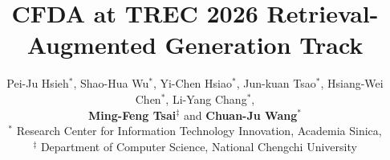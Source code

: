 \documentclass[11pt]{article}
\title{CFDA at TREC 2026 Retrieval-Augmented Generation Track}
\author{Pei-Ju Hsieh$^*$,
        Shao-Hua Wu$^*$, Yi-Chen Hsiao$^*$, Jun-kuan Tsao$^*$, Hsiang-Wei Chen$^*$,
        Li-Yang Chang$^*$, \\
        {\bf Ming-Feng Tsai$^\ddagger$} and {\bf Chuan-Ju Wang$^*$} \\
        $^*$ Research Center for Information Technology Innovation, Academia Sinica, \\
        $^\ddagger$ Department of Computer Science, National Chengchi University}
\begin{document}
\maketitle
\raggedbottom













\FloatBarrier
{\footnotesize
}
\appendix


\end{document}
